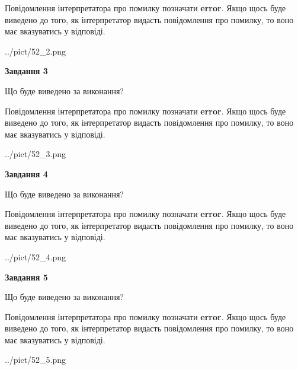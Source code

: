 \documentclass[12pt, ukrainian]{article}
\begin{document}
{\begin {large}
Повідомлення інтерпретатора про помилку позначати \textbf{error}.
Якщо щось буде виведено до того, як інтерпретатор видасть повідомлення про помилку, 
то воно має вказуватись у відповіді. \par


\begin{center}
	{../pict/52_2.png}
\end{center}
\newpage

{\begin {center}\textbf{Завдання 3}\end {center}}\par
Що буде виведено за виконання?

Повідомлення інтерпретатора про помилку позначати \textbf{error}.
Якщо щось буде виведено до того, як інтерпретатор видасть повідомлення про помилку, 
то воно має вказуватись у відповіді. \par


\begin{center}
	{../pict/52_3.png}
\end{center}
\newpage

{\begin {center}\textbf{Завдання 4}\end {center}}\par
Що буде виведено за виконання?

Повідомлення інтерпретатора про помилку позначати \textbf{error}.
Якщо щось буде виведено до того, як інтерпретатор видасть повідомлення про помилку, 
то воно має вказуватись у відповіді. \par


\begin{center}
	{../pict/52_4.png}
\end{center}
\newpage

{\begin {center}\textbf{Завдання 5}\end {center}}\par
Що буде виведено за виконання?

Повідомлення інтерпретатора про помилку позначати \textbf{error}.
Якщо щось буде виведено до того, як інтерпретатор видасть повідомлення про помилку, 
то воно має вказуватись у відповіді. \par


\begin{center}
	{../pict/52_5.png}
\end{center}
\newpage


\end{large}}
\end{document}
